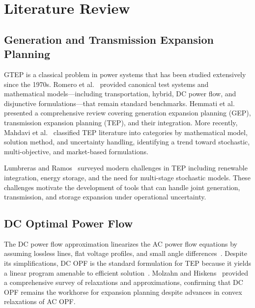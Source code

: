
\section{Literature Review}
\label{sec:literature}

\subsection{Generation and Transmission Expansion Planning}

GTEP is a classical problem in power systems that has been studied
extensively since the 1970s.  Romero et al.~\cite{romero2002test} provided
canonical test systems and mathematical models---including transportation,
hybrid, DC power flow, and disjunctive formulations---that remain standard
benchmarks.  Hemmati et al.~\cite{hemmati2013comprehensive} presented a
comprehensive review covering generation expansion planning (GEP),
transmission expansion planning (TEP), and their integration.  More
recently, Mahdavi et al.~\cite{mahdavi2019tep_survey} classified TEP
literature into categories by mathematical model, solution method, and
uncertainty handling, identifying a trend toward stochastic,
multi-objective, and market-based formulations.

Lumbreras and Ramos~\cite{lumbreras2016progressive} surveyed modern
challenges in TEP including renewable integration, energy storage, and
the need for multi-stage stochastic models.  These challenges motivate
the development of tools that can handle joint generation, transmission,
and storage expansion under operational uncertainty.

\subsection{DC Optimal Power Flow}

The DC power flow approximation linearizes the AC power flow equations
by assuming lossless lines, flat voltage profiles, and small angle
differences~\cite{stott2009dc_opf}.  Despite its simplifications, DC OPF
is the standard formulation for TEP because it yields a linear program
amenable to efficient solution~\cite{frank2016or_opf}.  Molzahn and
Hiskens~\cite{molzahn2019opf_survey} provided a comprehensive survey of
relaxations and approximations, confirming that DC OPF remains the
workhorse for expansion planning despite advances in convex relaxations
of AC OPF.

